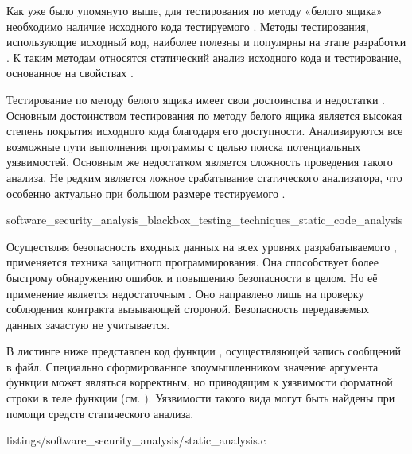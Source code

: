 %
Как уже было упомянуто выше, для тестирования  по методу «белого ящика» 
необходимо наличие исходного кода тестируемого . 
%
Методы тестирования, использующие исходный код, наиболее полезны и популярны на этапе разработки 
. 
%
К таким методам относятся статический анализ исходного кода и тестирование, основанное на свойствах 
.

%
Тестирование по методу белого ящика имеет свои достоинства и недостатки . 
%
Основным достоинством тестирования по методу белого ящика является высокая степень покрытия 
исходного кода благодаря его доступности. 
%
Анализируются все возможные пути выполнения программы с целью поиска потенциальных уязвимостей. 
%
Основным же недостатком является сложность проведения такого анализа. 
%
Не редким является ложное срабатывание статического анализатора, что особенно актуально при большом 
размере тестируемого .


	{software_security_analysis_blackbox_testing_techniques_static_code_analysis}

%
Осуществляя безопасность входных данных на всех уровнях разрабатываемого , 
применяется техника защитного программирования. 
%
Она способствует более быстрому обнаружению ошибок и повышению безопасности  
в целом. 
%
Но её применение является недостаточным . 
%
Оно направлено лишь на проверку соблюдения контракта вызывающей стороной. 
%
Безопасность передаваемых данных зачастую не учитывается. 

%
В листинге ниже представлен код функции , осуществляющей запись сообщений 
в файл. 
%
Специально сформированное злоумышленником значение аргумента функции  может 
являться корректным, но приводящим к уязвимости форматной строки  в теле 
функции (см. ). 
%
Уязвимости такого вида могут быть найдены при помощи средств статического анализа.

	{listings/software_security_analysis/static_analysis.c}

